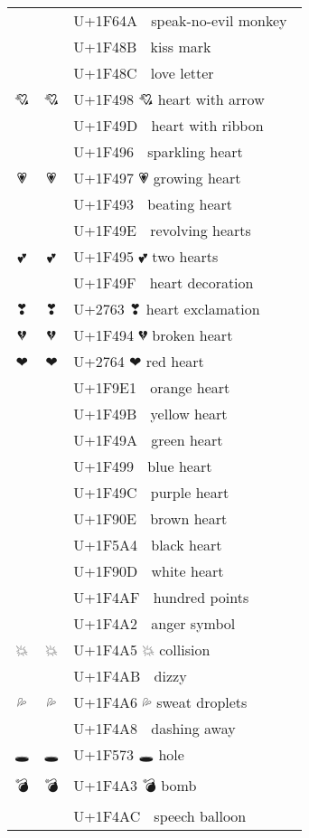 \documentclass[a4paper,12pt]{article}
\newcommand{\fontA}[1]{{\fontspec[RawFeature={dist,ccmp}]{Segoe UI Emoji} #1}}
\newcommand{\fontB}[1]{{\fontspec[Ligatures=Common,RawFeature={+ccmp}]{Symbola_Hinted.ttf} #1}}
\begin{document}
\begin{longtable}[c]{ccp{0.8\linewidth}}
\fontA{🙊}&\fontB{🙊}&U+1F64A 🙊 speak-no-evil monkey\\
\fontA{💋}&\fontB{💋}&U+1F48B 💋 kiss mark\\
\fontA{💌}&\fontB{💌}&U+1F48C 💌 love letter\\
\fontA{💘}&\fontB{💘}&U+1F498 💘 heart with arrow\\
\fontA{💝}&\fontB{💝}&U+1F49D 💝 heart with ribbon\\
\fontA{💖}&\fontB{💖}&U+1F496 💖 sparkling heart\\
\fontA{💗}&\fontB{💗}&U+1F497 💗 growing heart\\
\fontA{💓}&\fontB{💓}&U+1F493 💓 beating heart\\
\fontA{💞}&\fontB{💞}&U+1F49E 💞 revolving hearts\\
\fontA{💕}&\fontB{💕}&U+1F495 💕 two hearts\\
\fontA{💟}&\fontB{💟}&U+1F49F 💟 heart decoration\\
\fontA{❣}&\fontB{❣}&U+2763 ❣ heart exclamation\\
\fontA{💔}&\fontB{💔}&U+1F494 💔 broken heart\\
\fontA{❤}&\fontB{❤}&U+2764 ❤ red heart\\
\fontA{🧡}&\fontB{🧡}&U+1F9E1 🧡 orange heart\\
\fontA{💛}&\fontB{💛}&U+1F49B 💛 yellow heart\\
\fontA{💚}&\fontB{💚}&U+1F49A 💚 green heart\\
\fontA{💙}&\fontB{💙}&U+1F499 💙 blue heart\\
\fontA{💜}&\fontB{💜}&U+1F49C 💜 purple heart\\
\fontA{🤎}&\fontB{🤎}&U+1F90E 🤎 brown heart\\
\fontA{🖤}&\fontB{🖤}&U+1F5A4 🖤 black heart\\
\fontA{🤍}&\fontB{🤍}&U+1F90D 🤍 white heart\\
\fontA{💯}&\fontB{💯}&U+1F4AF 💯 hundred points\\
\fontA{💢}&\fontB{💢}&U+1F4A2 💢 anger symbol\\
\fontA{💥}&\fontB{💥}&U+1F4A5 💥 collision\\
\fontA{💫}&\fontB{💫}&U+1F4AB 💫 dizzy\\
\fontA{💦}&\fontB{💦}&U+1F4A6 💦 sweat droplets\\
\fontA{💨}&\fontB{💨}&U+1F4A8 💨 dashing away\\
\fontA{🕳}&\fontB{🕳}&U+1F573 🕳 hole\\
\fontA{💣}&\fontB{💣}&U+1F4A3 💣 bomb\\
\fontA{💬}&\fontB{💬}&U+1F4AC 💬 speech balloon\\

\end{longtable}
\end{document}
